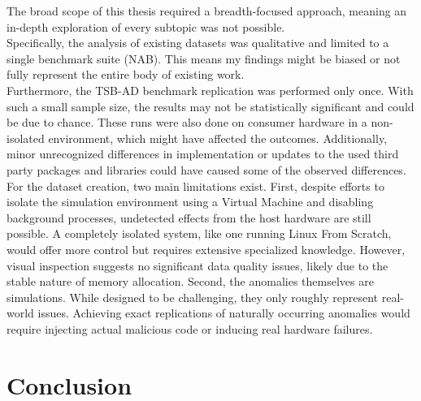 \documentclass[12pt,oneside]{article}
\begin{document}
The broad scope of this thesis required a breadth-focused approach, meaning an in-depth exploration of every subtopic was not possible. \\
Specifically, the analysis of existing datasets was qualitative and limited to a single benchmark suite (NAB). This means my findings might be biased or not fully represent the entire body of existing work.\\
Furthermore, the TSB-AD benchmark replication was performed only once. With such a small sample size, the results may not be statistically significant and could be due to chance. These runs were also done on consumer hardware in a non-isolated environment, which might have affected the outcomes. Additionally, minor unrecognized differences in implementation or updates to the used third party packages and libraries could have caused some of the observed differences. \\
For the dataset creation, two main limitations exist. First, despite efforts to isolate the simulation environment using a Virtual Machine and disabling background processes, undetected effects from the host hardware are still possible. A completely isolated system, like one running Linux From Scratch, would offer more control but requires extensive specialized knowledge. However, visual inspection suggests no significant data quality issues, likely due to the stable nature of memory allocation. Second, the anomalies themselves are simulations. While designed to be challenging, they only roughly represent real-world issues. Achieving exact replications of naturally occurring anomalies would require injecting actual malicious code or inducing real hardware failures.

\section{Conclusion}
\end{document}
